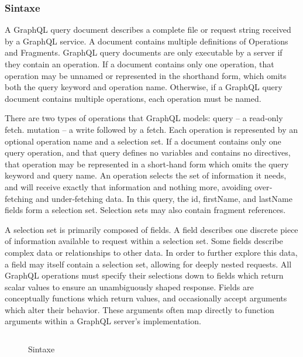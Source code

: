 \subsubsection[Sintaxe]{Sintaxe}

A GraphQL query document describes a complete file or request string received by a GraphQL service. A document contains multiple definitions of Operations and Fragments. GraphQL query documents are only executable by a server if they contain an operation. If a document contains only one operation, that operation may be unnamed or represented in the shorthand form, which omits both the query keyword and operation name. Otherwise, if a GraphQL query document contains multiple operations, each operation must be named.

There are two types of operations that GraphQL models: query – a read‐only fetch. mutation – a write followed by a fetch. Each operation is represented by an optional operation name and a selection set. If a document contains only one query operation, and that query defines no variables and contains no directives, that operation may be represented in a short‐hand form which omits the query keyword and query name. An operation selects the set of information it needs, and will receive exactly that information and nothing more, avoiding over‐fetching and under‐fetching data. In this query, the id, firstName, and lastName fields form a selection set. Selection sets may also contain fragment references.

A selection set is primarily composed of fields. A field describes one discrete piece of information available to request within a selection set. Some fields describe complex data or relationships to other data. In order to further explore this data, a field may itself contain a selection set, allowing for deeply nested requests. All GraphQL operations must specify their selections down to fields which return scalar values to ensure an unambiguously shaped response. Fields are conceptually functions which return values, and occasionally accept arguments which alter their behavior. These arguments often map directly to function arguments within a GraphQL server’s implementation.

\begin{figure}[H]
  \centering
  \inputminted[frame=single,framesep=10pt]{javascript}{anexos/graphql-syntax.txt}
  \caption{Sintaxe}
\end{figure}
